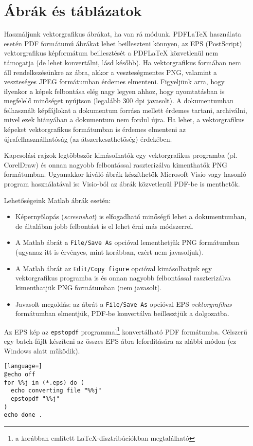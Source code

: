 \section{Ábrák és táblázatok}
Használjunk vektorgrafikus ábrákat, ha van rá módunk. PDFLaTeX használata esetén PDF formátumú ábrákat lehet beilleszteni könnyen, az EPS (PostScript) vektorgrafikus képformátum beillesztését a PDFLaTeX közvetlenül nem támogatja (de lehet konvertálni, lásd később). Ha vektorgrafikus formában nem áll rendelkezésünkre az ábra, akkor a  veszteségmentes PNG, valamint a veszteséges JPEG formátumban érdemes elmenteni.  Figyeljünk arra, hogy ilyenkor a képek felbontása elég nagy legyen ahhoz, hogy nyomtatásban is megfelelő minőséget nyújtson (legalább 300 dpi javasolt). A dokumentumban felhasznált képfájlokat a dokumentum forrása mellett érdemes tartani, archiválni, mivel ezek hiányában a dokumentum nem fordul újra. Ha lehet, a vektorgrafikus képeket vektorgrafikus formátumban is érdemes elmenteni az újrafelhasználhatóság (az átszerkeszthetőség) érdekében.

Kapcsolási rajzok legtöbbször kimásolhatók egy vektorgrafikus programba (pl. CorelDraw) és onnan nagyobb felbontással raszterizálva kimenthatők PNG formátumban. Ugyanakkor kiváló ábrák készíthetők Microsoft Visio vagy hasonló program használatával is: Visio-ból az ábrák közvetlenül PDF-be is menthetők.

Lehetőségeink Matlab ábrák esetén:
\begin{itemize}
	\item Képernyőlopás (\emph{screenshot}) is elfogadható minőségű lehet a dokumentumban, de általában jobb felbontást is el lehet érni más módszerrel.
	\item A Matlab ábrát a \verb+File/Save As+ opcióval lementhetjük PNG formátumban (ugyanaz itt is érvényes, mint korábban, ezért nem javasoljuk).
	\item A Matlab ábrát az \verb+Edit/Copy figure+ opcióval kimásolhatjuk egy vektorgrafikus programba is és onnan nagyobb felbontással raszterizálva kimenthatjük PNG formátumban (nem javasolt).
	\item Javasolt megoldás: az ábrát a \verb+File/Save As+ opcióval EPS \emph{vektorgrafikus} formátumban elmentjük, PDF-be konvertálva beillesztjük a dolgozatba.
\end{itemize}
Az EPS kép az \verb+epstopdf+ programmal\footnote{a korábban említett \LaTeX-disztribúciókban megtalálható} konvertálható PDF formátumba. Célszerű egy batch-fájlt készíteni az összes EPS ábra lefordítására az alábbi módon (ez Windows alatt működik).
\begin{lstlisting}[language=]
@echo off
for %%j in (*.eps) do (
  echo converting file "%%j"
  epstopdf "%%j"
)
echo done .
\end{lstlisting}

